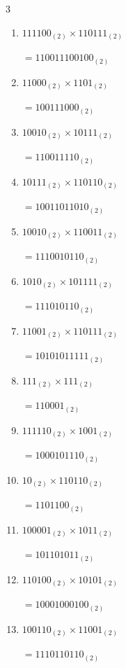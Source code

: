 \begin{multicols}{3}
\begin{enumerate}
  \item $111100_{(2)} \times 110111_{(2)}$

        $=110011100100_{(2)}$

  \item $11000_{(2)} \times 1101_{(2)}$

        $=100111000_{(2)}$

  \item $10010_{(2)} \times 10111_{(2)}$

        $=110011110_{(2)}$

  \item $10111_{(2)} \times 110110_{(2)}$

        $=10011011010_{(2)}$

\columnbreak %

  \item $10010_{(2)} \times 110011_{(2)}$

        $=1110010110_{(2)}$

  \item $1010_{(2)} \times 101111_{(2)}$

        $=111010110_{(2)}$

  \item $11001_{(2)} \times 110111_{(2)}$

        $=10101011111_{(2)}$

  \item $111_{(2)} \times 111_{(2)}$

        $=110001_{(2)}$

  \item $111110_{(2)} \times 1001_{(2)}$

        $=1000101110_{(2)}$

\columnbreak %

\resetques

  \item $10_{(2)} \times 110110_{(2)}$

        $=1101100_{(2)}$

  \item $100001_{(2)} \times 1011_{(2)}$

        $=101101011_{(2)}$

  \item $110100_{(2)} \times 10101_{(2)}$

        $=10001000100_{(2)}$

  \item $100110_{(2)} \times 11001_{(2)}$

        $=1110110110_{(2)}$


\end{enumerate}
\end{multicols}
